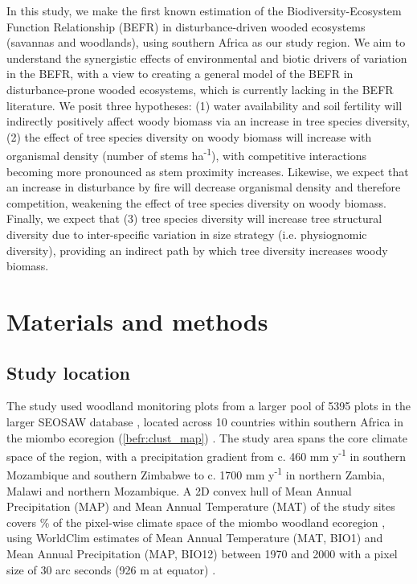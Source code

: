 \begin{refsection}
In this study, we make the first known estimation of the Biodiversity-Ecosystem Function Relationship (BEFR) in disturbance-driven wooded ecosystems (savannas and woodlands), using southern Africa as our study region. We aim to understand the synergistic effects of environmental and biotic drivers of variation in the BEFR, with a view to creating a general model of the BEFR in disturbance-prone wooded ecosystems, which is currently lacking in the BEFR literature. We posit three hypotheses: (1) water availability and soil fertility will indirectly positively affect woody biomass via an increase in tree species diversity, (2) the effect of tree species diversity on woody biomass will increase with organismal density (number of stems ha\textsuperscript{-1}), with competitive interactions becoming more pronounced as stem proximity increases. Likewise, we expect that an increase in disturbance by fire will decrease organismal density and therefore competition, weakening the effect of tree species diversity on woody biomass. Finally, we expect that (3) tree species diversity will increase tree structural diversity due to inter-specific variation in size strategy (i.e. physiognomic diversity), providing an indirect path by which tree diversity increases woody biomass.

\section{Materials and methods}
\label{befr:sec:methods}

\subsection{Study location}
\label{befr:ssec:location}

The study used \nplots{} woodland monitoring plots from a larger pool of 5395 plots in the larger SEOSAW database \citep{Ryan2020}, located across 10 countries within southern Africa in the miombo ecoregion (\autoref{befr:clust_map}) \citep{White1983}. The study area spans the core climate space of the region, with a precipitation gradient from c. 460 mm y\textsuperscript{-1} in southern Mozambique and southern Zimbabwe to c. 1700 mm y\textsuperscript{-1} in northern Zambia, Malawi and northern Mozambique. A 2D convex hull of Mean Annual Precipitation (MAP) and Mean Annual Temperature (MAT) of the study sites covers \hullcover{}\% of the pixel-wise climate space of the miombo woodland ecoregion \citep{White1983}, using WorldClim estimates of Mean Annual Temperature (MAT, BIO1) and Mean Annual Precipitation (MAP, BIO12) between 1970 and 2000 with a pixel size of 30 arc seconds (926 m at equator) \citep{Fick2017}. 


\end{refsection}
